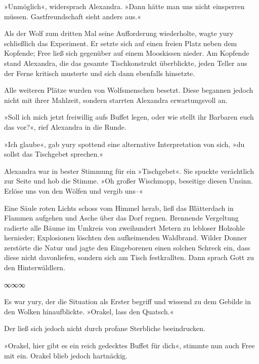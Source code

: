 »Unmöglich«, widersprach Alexandra. »Dann hätte man uns nicht einsperren müssen. Gastfreundschaft sieht anders aus.«

Als der Wolf zum dritten Mal seine Aufforderung wiederholte, wagte yury schließlich das Experiment. Er setzte sich auf einen freien Platz neben dem Kopfende; Free ließ sich gegenüber auf einem Mooskissen nieder. Am Kopfende stand Alexandra, die das gesamte Tischkonstrukt überblickte, jeden Teller aus der Ferne kritisch musterte und sich dann ebenfalls hinsetzte.

Alle weiteren Plätze wurden von Wolfsmenschen besetzt. Diese begannen jedoch nicht mit ihrer Mahlzeit, sondern starrten Alexandra erwartungsvoll an.

»Soll ich mich jetzt freiwillig aufs Buffet legen, oder wie stellt ihr Barbaren euch das vor?«, rief Alexandra in die Runde.

»Ich glaube«, gab yury spottend eine alternative Interpretation von sich, »du sollst das Tischgebet sprechen.«

Alexandra war in bester Stimmung für ein »Tischgebet«. Sie spuckte verächtlich zur Seite und hob die Stimme. »Oh großer Wischmopp, beseitige diesen Unsinn. Erlöse uns von den Wölfen und vergib uns–«

Eine Säule roten Lichts schoss vom Himmel herab, ließ das Blätterdach in Flammen aufgehen und Asche über das Dorf regnen. Brennende Vergeltung radierte alle Bäume im Umkreis von zweihundert Metern zu lebloser Holzohle hernieder; Explosionen löschten den aufkeimenden Waldbrand. Wilder Donner zerstörte die Natur und jagte den Eingeborenen einen solchen Schreck ein, dass diese nicht davonliefen, sondern sich am Tisch festkrallten. Dann sprach Gott zu den Hinterwäldlern.


\begin{center}
∞∞∞
\end{center}

Es war yury, der die Situation als Erster begriff und wissend zu dem Gebilde in den Wolken hinaufblickte. »Orakel, lass den Quatsch.«

Der ließ sich jedoch nicht durch profane Sterbliche beeindrucken. 

»Orakel, hier gibt es ein reich gedecktes Buffet für dich«, stimmte nun auch Free mit ein. Orakel blieb jedoch hartnäckig.

